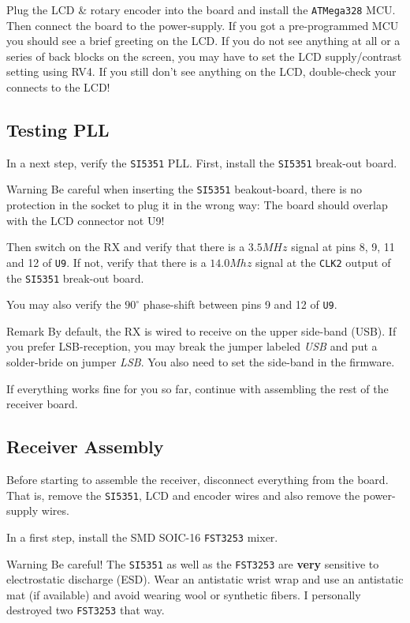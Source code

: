 \documentclass[10pt, a4paper,twoside]{scrartcl}
\newenvironment{remark}{\begin{bclogo}[couleur=blue!30,arrondi=.1,logo=\bcinfo,ombre=true]{Remark}}{\end{bclogo}}
\newenvironment{warning}{\begin{bclogo}[couleur=red!30,arrondi=.1,logo=\bcattention,ombre=true]{Warning}}{\end{bclogo}}
\begin{document}
 Plug the LCD \& rotary encoder into the board and install the \texttt{ATMega328} MCU. Then connect the board to the power-supply. If you got a pre-programmed MCU you should see a brief greeting on the LCD. If you do not see anything at all or a series of back blocks on the screen, you may have to set the LCD supply/contrast setting using RV4. If you still don't see anything on the LCD, double-check your connects to the LCD! 

\subsection{Testing PLL}
In a next step, verify the \texttt{SI5351} PLL. First, install the \texttt{SI5351} break-out board. 

\begin{warning}
 Be careful when inserting the \texttt{SI5351} beakout-board, there is no protection in the socket to plug it in the wrong way: The board should overlap with the LCD connector not U9!
\end{warning}
 
Then switch on the RX and verify that there is a $3.5MHz$ signal at pins 8, 9, 11 and 12 of \texttt{U9}. If not, verify that there is a $14.0Mhz$ signal at the \texttt{CLK2} output of the \texttt{SI5351} break-out board. 

You may also verify the $90^\circ$ phase-shift between pins 9 and 12 of \texttt{U9}.

\begin{remark}
By default, the RX is wired to receive on the upper side-band (USB). If you prefer LSB-reception, you may break the jumper labeled \emph{USB} and put a solder-bride on jumper \emph{LSB}. You also need to set the side-band in the firmware.
\end{remark} 

If everything works fine for you so far, continue with assembling the rest of the receiver board.


\subsection{Receiver Assembly}
Before starting to assemble the receiver, disconnect everything from the board. That is, remove the \texttt{SI5351}, LCD and encoder wires and also remove the power-supply wires.

In a first step, install the SMD SOIC-16 \texttt{FST3253} mixer. 

\begin{warning}
 Be careful! The \texttt{SI5351} as well as the \texttt{FST3253} are \textbf{very} sensitive to electrostatic discharge (ESD). Wear an antistatic wrist wrap and use an antistatic mat (if available) and avoid wearing wool or synthetic fibers. I personally destroyed two \texttt{FST3253} that way. 
\end{warning}
\end{document}
